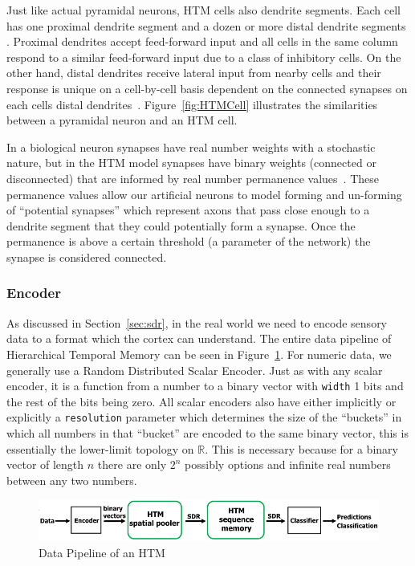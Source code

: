 \documentclass[oneside,12pt,openany]{book}
\begin{document}
	Just like actual pyramidal neurons, HTM cells also dendrite segments. Each cell has one proximal dendrite segment and a dozen or more distal dendrite segments \cite {Whitepaper}. Proximal dendrites accept feed-forward input and all cells in the same column respond to a similar feed-forward input due to a class of inhibitory cells. On the other hand, distal dendrites receive lateral input from nearby cells and their response is unique on a cell-by-cell basis dependent on the connected synapses on each cells distal dendrites~\cite{Whitepaper}. Figure~\ref{fig:HTMCell} illustrates the similarities between a pyramidal neuron and an HTM cell.
	
	In a biological neuron synapses have real number weights with a stochastic nature, but in the HTM model synapses have binary weights (connected or disconnected) that are informed by real number permanence values~\cite{Whitepaper}. These permanence values allow our artificial neurons to model forming and un-forming of ``potential synapses'' which represent axons that pass close enough to a dendrite segment that they could potentially form a synapse. Once the permanence is above a certain threshold (a parameter of the network) the synapse is considered connected.
	
	\subsubsection{Encoder}
	
	As discussed in Section~\ref{sec:sdr}, in the real world we need to encode sensory data to a format which the cortex can understand. The entire data pipeline of Hierarchical Temporal Memory can be seen in Figure~\ref{fig:HTMpipeline}. For numeric data, we generally use a Random Distributed Scalar Encoder. Just as with any scalar encoder, it is a function from a number to a binary vector with \texttt{width} 1 bits and the rest of the bits being zero. All scalar encoders also have either implicitly or explicitly a \texttt{resolution} parameter which determines the size of the ``buckets'' in which all numbers in that ``bucket'' are encoded to the same binary vector, this is essentially the lower-limit topology on $\mathbb{R}$. This is necessary because for a binary vector of length $n$ there are only $2^{n}$ possibly options and infinite real numbers between any two numbers.
	
	\begin{figure}[!ht]
		\centering
		\includegraphics[width=\linewidth]{images/DataPipeline.jpg}
		\caption[Data Pipeline of an HTM]{Data Pipeline of an HTM~\cite{TheHTMSpatialPooler}}
		\label{fig:HTMpipeline}
	\end{figure}
\end{document}
